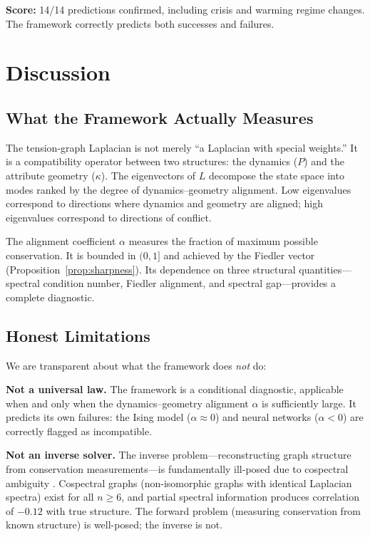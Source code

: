 \documentclass[12pt,letterpaper]{article}
\begin{document}
\medskip
\noindent\textbf{Score:} 14/14 predictions confirmed, including crisis and warming regime changes. The framework correctly predicts both successes and failures.

\section{Discussion}
\label{sec:discussion}

\subsection{What the Framework Actually Measures}

The tension-graph Laplacian is not merely ``a Laplacian with special weights.'' It is a compatibility operator between two structures: the dynamics ($P$) and the attribute geometry ($\kappa$). The eigenvectors of $L$ decompose the state space into modes ranked by the degree of dynamics--geometry alignment. Low eigenvalues correspond to directions where dynamics and geometry are aligned; high eigenvalues correspond to directions of conflict.

The alignment coefficient $\alpha$ measures the fraction of maximum possible conservation. It is bounded in $(0, 1]$ and achieved by the Fiedler vector (Proposition~\ref{prop:sharpness}). Its dependence on three structural quantities---spectral condition number, Fiedler alignment, and spectral gap---provides a complete diagnostic.

\subsection{Honest Limitations}

We are transparent about what the framework does \emph{not} do:

\textbf{Not a universal law.} The framework is a conditional diagnostic, applicable when and only when the dynamics--geometry alignment $\alpha$ is sufficiently large. It predicts its own failures: the Ising model ($\alpha \approx 0$) and neural networks ($\alpha < 0$) are correctly flagged as incompatible.

\textbf{Not an inverse solver.} The inverse problem---reconstructing graph structure from conservation measurements---is fundamentally ill-posed due to cospectral ambiguity \citep{vandam2003,haemers2004}. Cospectral graphs (non-isomorphic graphs with identical Laplacian spectra) exist for all $n \geq 6$, and partial spectral information produces correlation of $-0.12$ with true structure. The forward problem (measuring conservation from known structure) is well-posed; the inverse is not.
\end{document}

